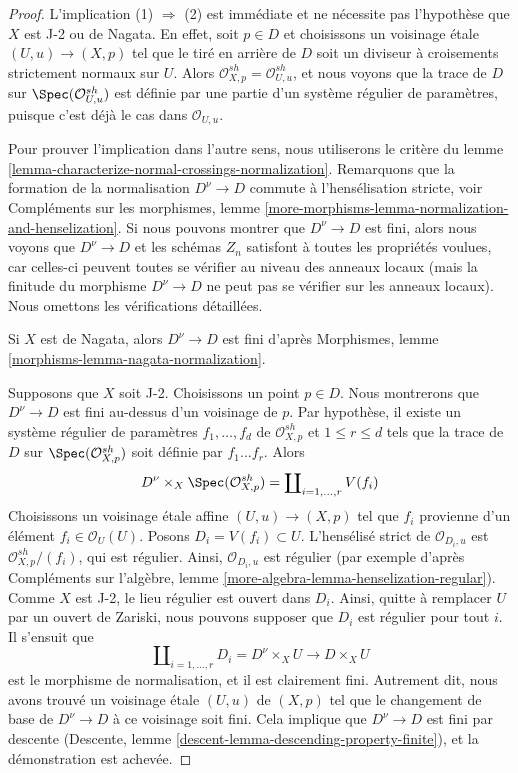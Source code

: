 \begin{proof}
L'implication (1) $\Rightarrow$ (2) est immédiate et
ne nécessite pas l'hypothèse que $X$ est J-2 ou de Nagata.
En effet, soit $p \in D$ et choisissons un voisinage \'etale
$(U, u) \to (X, p)$ tel que le tiré en arrière de $D$ soit
un diviseur à croisements strictement normaux sur $U$.
Alors $\mathcal{O}_{X, p}^{sh} = \mathcal{O}_{U, u}^{sh}$,
et nous voyons que la trace de $D$ sur $\Spec(\mathcal{O}_{U, u}^{sh})$
est définie par une partie d'un système régulier de paramètres,
puisque c'est déjà le cas dans $\mathcal{O}_{U, u}$.

\medskip\noindent
Pour prouver l'implication dans l'autre sens,
nous utiliserons le critère du
lemme \ref{lemma-characterize-normal-crossings-normalization}.
Remarquons que la formation de la normalisation $D^\nu \to D$
commute à l'hensélisation stricte, voir
Compléments sur les morphismes, lemme
\ref{more-morphisms-lemma-normalization-and-henselization}.
Si nous pouvons montrer que $D^\nu \to D$ est fini,
alors nous voyons que $D^\nu \to D$ et les schémas
$Z_n$ satisfont à toutes les propriétés voulues, car celles-ci
peuvent toutes se vérifier au niveau des anneaux locaux
(mais la finitude du morphisme $D^\nu \to D$
ne peut pas se vérifier sur les anneaux locaux).
Nous omettons les vérifications détaillées.

\medskip\noindent
Si $X$ est de Nagata, alors $D^\nu \to D$ est fini d'après
Morphismes, lemme \ref{morphisms-lemma-nagata-normalization}.

\medskip\noindent
Supposons que $X$ soit J-2. Choisissons un point $p \in D$. Nous montrerons
que $D^\nu \to D$ est fini au-dessus d'un voisinage de $p$.
Par hypothèse, il existe un système régulier de
paramètres $f_1, \ldots, f_d$ de $\mathcal{O}_{X, p}^{sh}$
et $1 \leq r \leq d$ tels que la trace de $D$ sur
$\Spec(\mathcal{O}_{X, p}^{sh})$ soit définie par $f_1 \ldots f_r$.
Alors
$$
D^\nu \times_X \Spec(\mathcal{O}_{X, p}^{sh}) = 
\coprod\nolimits_{i = 1, \ldots, r} V(f_i)
$$
Choisissons un voisinage \'etale affine
$(U, u) \to (X, p)$ tel que $f_i$ provienne d'un élément
$f_i \in \mathcal{O}_U(U)$. Posons $D_i = V(f_i) \subset U$.
L'hensélisé strict de $\mathcal{O}_{D_i, u}$
est $\mathcal{O}_{X, p}^{sh}/(f_i)$, qui est régulier.
Ainsi, $\mathcal{O}_{D_i, u}$ est régulier (par exemple d'après
Compléments sur l'algèbre, lemme \ref{more-algebra-lemma-henselization-regular}).
Comme $X$ est J-2, le lieu régulier est ouvert dans $D_i$.
Ainsi, quitte à remplacer $U$ par un ouvert de Zariski, nous pouvons supposer
que $D_i$ est régulier pour tout $i$. Il s'ensuit que
$$
\coprod\nolimits_{i = 1, \ldots, r} D_i = D^\nu \times_X U
\longrightarrow D \times_X U
$$
est le morphisme de normalisation, et il est clairement fini.
Autrement dit, nous avons trouvé
un voisinage \'etale $(U, u)$ de $(X, p)$ tel que
le changement de base de $D^\nu \to D$ à ce voisinage soit fini.
Cela implique que $D^\nu \to D$ est fini par descente
(Descente, lemme \ref{descent-lemma-descending-property-finite}),
et la démonstration est achevée.
\end{proof}













